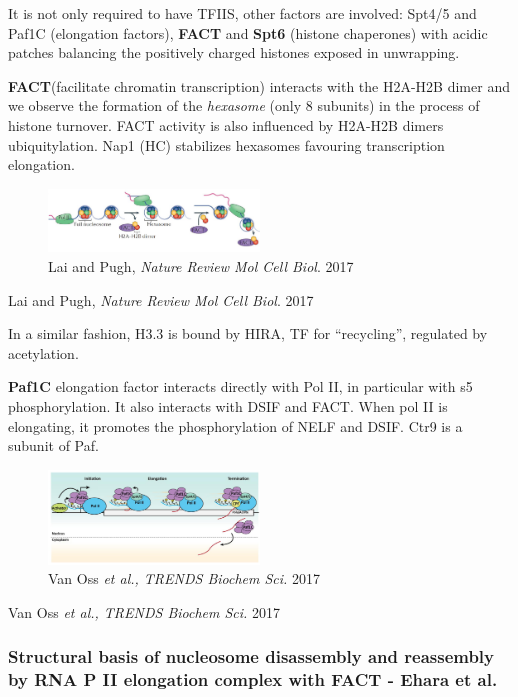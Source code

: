 It is not only required to have TFIIS, other factors are involved: Spt4/5 and Paf1C (elongation factors), \textbf{FACT} and \textbf{Spt6} (histone chaperones) with acidic patches balancing the positively charged histones exposed in unwrapping.

\textbf{FACT}(facilitate chromatin transcription) interacts with the H2A-H2B dimer and we observe the formation of the \emph{hexasome} (only 8 subunits) in the process of histone turnover. FACT activity is also influenced by H2A-H2B dimers ubiquitylation. Nap1 (HC) stabilizes hexasomes favouring transcription elongation.

\begin{figure}
\centering
\includegraphics[width=0.5\textwidth]{../_resources/Screenshot_2022-10-05_at_23-05-01.png}
\caption{Lai and Pugh, \emph{Nature Review Mol Cell Biol}. 2017}
\end{figure}

Lai and Pugh, \emph{Nature Review Mol Cell Biol}. 2017

In a similar fashion, H3.3 is bound by HIRA, TF for ``recycling'', regulated by acetylation.

\textbf{Paf1C} elongation factor interacts directly with Pol II, in particular with s5 phosphorylation. It also interacts with DSIF and FACT. When pol II is elongating, it promotes the phosphorylation of NELF and DSIF. Ctr9 is a subunit of Paf.

\begin{figure}
\centering
\includegraphics[width=0.5\textwidth]{../_resources/Screenshot_2022-10-05_at_23-05-58.png}
\caption{Van Oss \emph{et al., TRENDS Biochem Sci.} 2017}
\end{figure}

Van Oss \emph{et al., TRENDS Biochem Sci.} 2017

\hypertarget{structural-basis-of-nucleosome-disassembly-and-reassembly-by-rna-p-ii-elongation-complex-with-fact---ehara-et-al.}{%
\subsubsection{Structural basis of nucleosome disassembly and reassembly by RNA P II elongation complex with FACT - Ehara et al.}\label{structural-basis-of-nucleosome-disassembly-and-reassembly-by-rna-p-ii-elongation-complex-with-fact---ehara-et-al.}}

